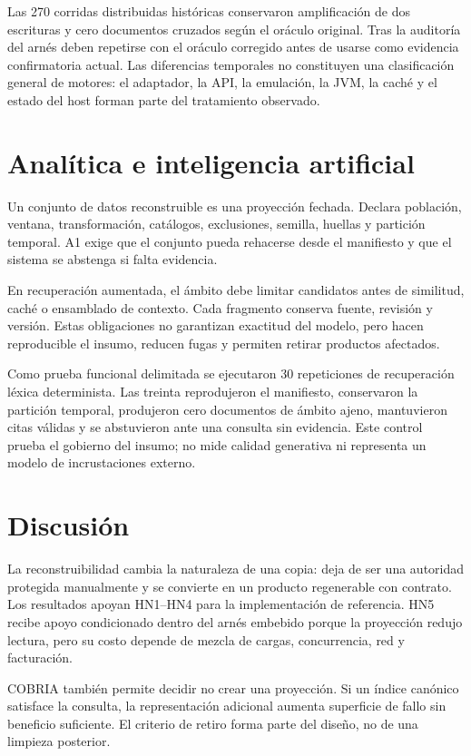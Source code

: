 \documentclass[11pt]{article}
\begin{document}
Las 270 corridas distribuidas históricas conservaron amplificación de dos escrituras y cero documentos cruzados según el oráculo original. Tras la auditoría del arnés deben repetirse con el oráculo corregido antes de usarse como evidencia confirmatoria actual. Las diferencias temporales no constituyen una clasificación general de motores: el adaptador, la API, la emulación, la JVM, la caché y el estado del host forman parte del tratamiento observado.

\section{Analítica e inteligencia artificial}
Un conjunto de datos reconstruible es una proyección fechada. Declara población, ventana, transformación, catálogos, exclusiones, semilla, huellas y partición temporal. A1 exige que el conjunto pueda rehacerse desde el manifiesto y que el sistema se abstenga si falta evidencia.

En recuperación aumentada, el ámbito debe limitar candidatos antes de similitud, caché o ensamblado de contexto. Cada fragmento conserva fuente, revisión y versión. Estas obligaciones no garantizan exactitud del modelo, pero hacen reproducible el insumo, reducen fugas y permiten retirar productos afectados.

Como prueba funcional delimitada se ejecutaron 30 repeticiones de recuperación léxica determinista. Las treinta reprodujeron el manifiesto, conservaron la partición temporal, produjeron cero documentos de ámbito ajeno, mantuvieron citas válidas y se abstuvieron ante una consulta sin evidencia. Este control prueba el gobierno del insumo; no mide calidad generativa ni representa un modelo de incrustaciones externo.

\section{Discusión}
La reconstruibilidad cambia la naturaleza de una copia: deja de ser una autoridad protegida manualmente y se convierte en un producto regenerable con contrato. Los resultados apoyan HN1--HN4 para la implementación de referencia. HN5 recibe apoyo condicionado dentro del arnés embebido porque la proyección redujo lectura, pero su costo depende de mezcla de cargas, concurrencia, red y facturación.

COBRIA también permite decidir no crear una proyección. Si un índice canónico satisface la consulta, la representación adicional aumenta superficie de fallo sin beneficio suficiente. El criterio de retiro forma parte del diseño, no de una limpieza posterior.
\end{document}
